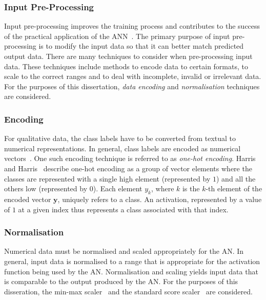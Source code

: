 \subsubsection{Input Pre-Processing}\label{sec:anns:an:input:input_pre_processing}

Input pre-processing improves the training process and contributes to the success of the practical application of the \acs{ANN}~\cite{ref:kuzniar:2017}. The primary purpose of input pre-processing is to modify the input data so that it can better match predicted output data. There are many techniques to consider when pre-processing input data. These techniques include methods to encode data to certain formats, to scale to the correct ranges and to deal with incomplete, invalid or irrelevant data. For the purposes of this dissertation, \textit{data encoding} and \textit{normalisation} techniques are considered.


\subsubsection{Encoding}\label{sec:anns:an:input:encoding}

For qualitative data, the class labels have to be converted from textual to numerical representations. In general, class labels are encoded as numerical vectors~\cite{ref:srinidhi:2018, ref:brownlee:2017:one-hot}. One such encoding technique is referred to as \textit{one-hot encoding}. Harris and Harris~\cite{ref:harris:2010} describe one-hot encoding as a group of vector elements where the classes are represented with a single high element (represented by $1$) and all the others low (represented by $0$). Each element $y_k$, where $k$ is the $k$-th element of the encoded vector $\boldsymbol{y}$, uniquely refers to a class. An activation, represented by a value of $1$ at a given index thus represents a class associated with that index.

\subsubsection{Normalisation}\label{sec:anns:an:input:normalisation}

Numerical data must be normalised and scaled appropriately for the \acs{AN}. In general, input data is normalised to a range that is appropriate for the activation function being used by the \acs{AN}. Normalisation and scaling yields input data that is comparable to the output produced by the \acs{AN}. For the purposes of this disseration, the min-max scaler~\cite{ref:al:2006} and the standard score scaler~\cite{ref:jain:2005} are considered.


